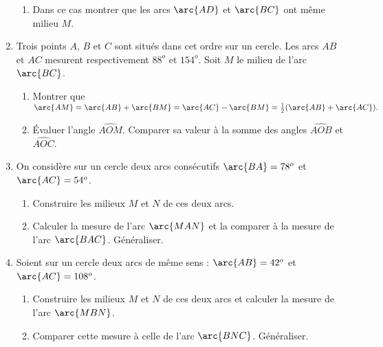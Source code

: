 \documentclass[12 pt]{report}
\theoremstyle{plain}
\newcounter{n}
\begin{document}
\begin{enumerate}
\begin{enumerate}
\item Dans ce cas montrer que les arcs $\arc{AD}$ et $\arc{BC}$ ont même milieu $M$. 
\end{enumerate}
\item Trois points $A$, $B$ et $C$ sont situés dans cet ordre sur un cercle. Les arcs $AB$ et $AC$ mesurent respectivement $88^o$ et $154^o$. Soit $M$ le milieu de l'arc $\arc{BC}$.\begin{enumerate}
\item Montrer que $\arc{AM}=\arc{AB}+\arc{BM}=\arc{AC}-\arc{BM} = \frac12(\arc{AB}+\arc{AC}).$
\item Évaluer l'angle $\widehat{AOM}$. Comparer sa valeur à la somme des angles 
$\widehat{AOB}$ et $\widehat{AOC}$. 
\end{enumerate}
\item On considère sur un cercle deux arcs consécutifs $\arc{BA}=78^o$ et $\arc{AC}=54^o$. 
\begin{enumerate}
\item Construire les milieux $M$ et $N$ de ces deux arcs. 
\item Calculer la mesure de l'arc $\arc{MAN}$ et la comparer à la mesure de l'arc $\arc{BAC}$. Généraliser. 
\end{enumerate}
\item Soient sur un cercle deux arcs de même sens : $\arc{AB}=42^o$ et $\arc{AC}= 108^o$. \begin{enumerate}
\item Construire les milieux $M$ et $N$ de ces deux arcs et calculer la mesure de 
l'arc $\arc{MBN}$. 
\item Comparer cette mesure à celle de l'arc $\arc{BNC}$. Généraliser. 
\end{enumerate}
\end{enumerate}
\end{document}
